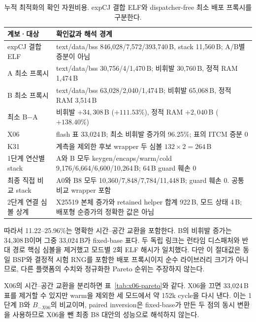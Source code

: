\documentclass[runningheads,orivec]{llncs}
\begin{document}
\begin{table}[H]\centering\footnotesize
\caption{누적 최적화의 확인 자원비용. expCJ 결합 ELF와 dispatcher-free 최소 배포
프록시를 구분한다.}
\label{tab:cumulative-resources}
\setlength{\tabcolsep}{2.5pt}
\renewcommand{\arraystretch}{1.12}
\begin{tabularx}{\textwidth}{@{}>{\raggedright\arraybackslash}p{2.55cm}>{\raggedright\arraybackslash}X@{}}\toprule
계보·대상 & 확인값과 해석 경계\\\midrule
expCJ 결합 ELF & text/data/bss 846,028/7,572/393,740\,B, stack 11,560\,B; A/B별 증분이 아님\\
A 최소 프록시 & text/data/bss 30,756/4/1,470\,B; 비휘발 30,760\,B, 정적 RAM 1,474\,B\\
B 최소 프록시 & text/data/bss 63,028/2,040/1,474\,B; 비휘발 65,068\,B, 정적 RAM 3,514\,B\\
최소 B$-$A & 비휘발 $+34,308$\,B ($+111.53\%$), 정적 RAM $+2,040$\,B ($+138.40\%$)\\
X06 & flash 표 33,024\,B; 최소 비휘발 증가의 96.25\%; 표의 ITCM 증분 0\\
K31 & 계측을 제외한 후보 wrapper 두 심볼 $132\times2=264$\,B\\
1단계 연산별 stack & A와 B 모두 keygen/encaps/warm/cold 9,176/6,664/6,600/10,264\,B; 64\,B guard 훼손 0\\
최종 직접 비교 stack & A0와 B8 모두 10,360/7,848/7,784/11,448\,B; guard 훼손 0. 공통 비교 wrapper 포함\\
2단계 연결 심볼 상계 & X25519 본체 증가와 retained helper 합계 922\,B, 모드 상태 4\,B; 배포형 순증가의 정확한 값은 아님\\\bottomrule
\end{tabularx}
\end{table}
\FloatBarrier

따라서 11.22--25.96\%는 명확한 시간--공간 교환을 포함한다. B의 비휘발 증가는
34,308\,B이며 그중 33,024\,B가 fixed-base 표다. 두 독립 링크는 런타임 디스패처와
반대 경로 핵심 심볼을 제거했고 모드별 2회 ELF 해시가 일치했다. 다만 이 절대값은
동일 BSP와 결정적 시험 RNG를 포함한 배포 프록시이지 순수 라이브러리 크기가 아니므로,
다른 플랫폼의 수치와 정규화한 Pareto 순위는 주장하지 않는다.

X06의 시간--공간 교환을 분리하면 표~\ref{tab:x06-pareto}와 같다. X06을 끄면
33,024\,B 표를 제거할 수 있지만 warm을 제외한 세 모드에서 약 152k cycle을 다시 낸다.
이는 1단계 B와 $B_{-X06}$의 비교이며, paired inversion은 fixed-base가 만든 두 점의
동시 변환을 사용하므로 X06을 뺀 최종 B8 대안의 성능으로 해석하지 않는다.
\end{document}
